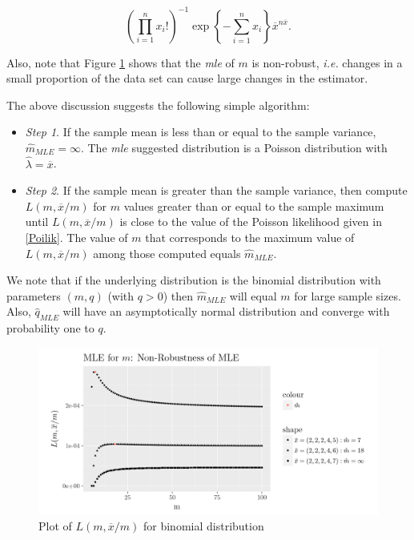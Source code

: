 \documentclass[]{book}
\providecommand{\tightlist}{%
  \setlength{\itemsep}{0pt}\setlength{\parskip}{0pt}}
\theoremstyle{definition}
\theoremstyle{definition}
\theoremstyle{definition}
\theoremstyle{remark}
\begin{document}
\begin{equation}
\left(\prod_{i=1}^n x_i! \right)^{-1} \exp\left\{-\sum_{i=1}^n x_i\right\} \overline{x}^{n\overline{x}}.
\label{eq:Poilik}
\end{equation}

Also, note that Figure \ref{fig:MLEm} shows that the \emph{mle} of \(m\)
is non-robust, \emph{i.e.} changes in a small proportion of the data set
can cause large changes in the estimator.

The above discussion suggests the following simple algorithm:

\begin{itemize}
\tightlist
\item
  \emph{Step 1}. If the sample mean is less than or equal to the sample
  variance, \(\hat{m}_{MLE}=\infty\). The \emph{mle} suggested
  distribution is a Poisson distribution with
  \(\hat{\lambda}=\overline{x}\).
\item
  \emph{Step 2}. If the sample mean is greater than the sample variance,
  then compute \(L(m,\overline{x}/m)\) for \(m\) values greater than or
  equal to the sample maximum until \(L(m,\overline{x}/m)\) is close to
  the value of the Poisson likelihood given in \eqref{Poilik}. The value
  of \(m\) that corresponds to the maximum value of
  \(L(m,\overline{x}/m)\) among those computed equals \(\hat{m}_{MLE}\).
\end{itemize}

We note that if the underlying distribution is the binomial distribution
with parameters \((m,q)\) (with \(q>0\)) then \(\hat{m}_{MLE}\) will
equal \(m\) for large sample sizes. Also, \(\hat{q}_{MLE}\) will have an
asymptotically normal distribution and converge with probability one to
\(q\).

\begin{figure}

{\centering \includegraphics[width=0.8\linewidth]{Figures/figure2.2} 

}

\caption{Plot of $L(m,\overline{x}/m)$ for binomial distribution}\label{fig:MLEm}
\end{figure}
\end{document}
